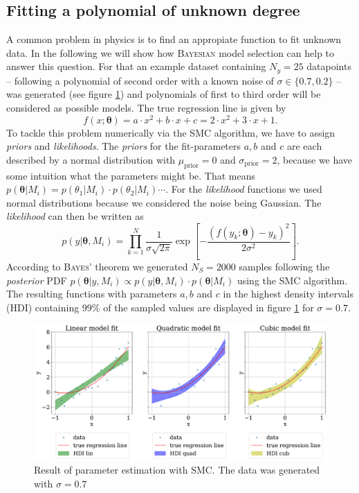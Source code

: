\documentclass[%
 reprint,
 amsmath,amssymb,
 aps,
]{revtex4-1}
\newcommand{\btheta}{\boldsymbol{\theta}}
\begin{document}
\subsection{Fitting a polynomial of unknown degree}\label{sec:poly}
\noindent A common problem in physics is to find an appropiate function to fit unknown data. In the following we will show how \textsc{Bayesian} model selection can help to answer this question. For that an example dataset containing $N_y=25$ datapoints -- following a polynomial of second order with a known noise of $\sigma\in\{0.7, 0.2\}$ -- was generated (see figure \ref{fig:HDI_sigma_07}) and polynomials of first to third order will be considered as possible models. 
The true regression line is given by
\begin{equation*}
	f(x;\btheta)=a\cdot x^2+b\cdot x+c=2\cdot x^2+3\cdot x+1.
\end{equation*}
To tackle this problem numerically via the SMC algorithm, we have to assign \emph{priors} and \emph{likelihoods}. The \emph{priors} for the fit-parameters $a,b$ and $c$  are each described by a normal distribution with $\mu_{\text{prior}}=0$ and $\sigma_{\text{prior}}=2$, because we have some intuition what the parameters might be. That means $p(\btheta|M_i)=p(\theta_1|M_i)\cdot p(\theta_2|M_i)\cdots $. For the \emph{likelihood} functions we used normal distributions because we considered the noise being Gaussian. The \emph{likelihood} can then be written as \cite[Chap. 3]{sivia}
$$p(y|\btheta, M_i)=\prod_{k=1}^{N}\frac{1}{\sigma\sqrt{2\pi}}\exp{\left[-\frac{(f(y_k;\btheta)-y_k)^2}{2\sigma^2}\right]}.$$
According to \textsc{Bayes'} theorem we generated $N_S= 2000$ samples following the \emph{posterior} PDF $p(\btheta|y,M_i)\propto p(y|\btheta, M_i)\cdot p(\btheta|M_i) $ using the SMC algorithm. The resulting functions with parameters $a,b$ and $c$ in the highest density intervals (HDI) containing 99\% of the sampled values are displayed in figure \ref{fig:HDI_sigma_07} for $\sigma=0.7$.
\begin{figure}
	\includegraphics[width=\textwidth]{HDI_sigma_07}
	\caption{Result of parameter estimation with SMC. The data was generated with $\sigma=0.7$}\label{fig:HDI_sigma_07}
\end{figure}
\end{document}
